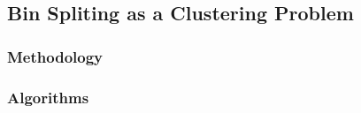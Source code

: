 \documentclass[twoside]{article}
\begin{document}


\subsection{Bin Spliting as a Clustering Problem}

\subsubsection{Methodology}



\subsubsection{Algorithms}
\end{document}

